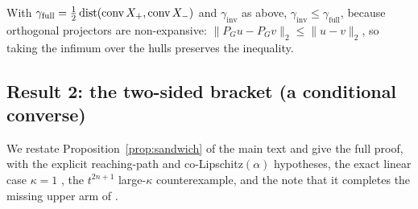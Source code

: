 \begin{corollary}\label{cor:proj-mono}
With $\gamma_{\mathrm{full}}=\tfrac12\operatorname{dist}(\operatorname{conv} X_+,\operatorname{conv} X_-)$ and
$\gamma_{\mathrm{inv}}$ as above, $\gamma_{\mathrm{inv}}\le\gamma_{\mathrm{full}}$,
because orthogonal projectors are non-expansive:
$\lVert P_Gu-P_Gv\rVert_2\le\lVert u-v\rVert_2$, so taking the infimum over the
hulls preserves the inequality.
\end{corollary}

\subsection{Result 2: the two-sided bracket (a conditional converse)}
\label{app:ft-bracket}
We restate Proposition~\ref{prop:sandwich} of the main text and give the full
proof, with the explicit reaching-path and co-Lipschitz$(\alpha)$ hypotheses,
the exact linear case $\kappa=1$ \citep{hein2017formal}, the $t^{2n+1}$
large-$\kappa$ counterexample, and the note that it completes the missing upper
arm of \citet{tsuzuku2018lipschitz}.

